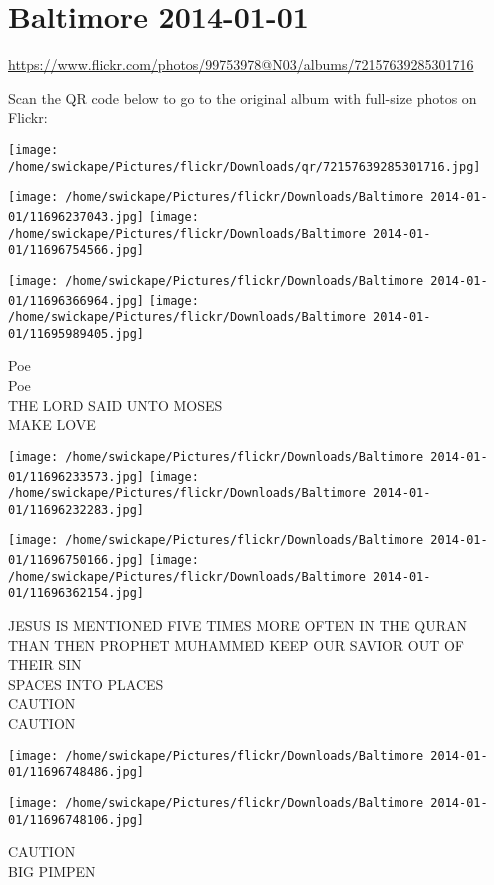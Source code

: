 \documentclass[10pt,letterpaper]{article}
\title{}
\author{}
\date{}
\begin{document}
\section*{Baltimore 2014-01-01}

\url{https://www.flickr.com/photos/99753978@N03/albums/72157639285301716}

Scan the QR code below to go to the original album with full-size photos on Flickr:

\texttt{[image: /home/swickape/Pictures/flickr/Downloads/qr/72157639285301716.jpg]}
\pagebreak

\texttt{[image: /home/swickape/Pictures/flickr/Downloads/Baltimore 2014-01-01/11696237043.jpg]}
\texttt{[image: /home/swickape/Pictures/flickr/Downloads/Baltimore 2014-01-01/11696754566.jpg]}

\texttt{[image: /home/swickape/Pictures/flickr/Downloads/Baltimore 2014-01-01/11696366964.jpg]}
\texttt{[image: /home/swickape/Pictures/flickr/Downloads/Baltimore 2014-01-01/11695989405.jpg]}

Poe\\
Poe\\
THE LORD SAID UNTO MOSES\\
MAKE LOVE
\pagebreak

\texttt{[image: /home/swickape/Pictures/flickr/Downloads/Baltimore 2014-01-01/11696233573.jpg]}
\texttt{[image: /home/swickape/Pictures/flickr/Downloads/Baltimore 2014-01-01/11696232283.jpg]}

\texttt{[image: /home/swickape/Pictures/flickr/Downloads/Baltimore 2014-01-01/11696750166.jpg]}
\texttt{[image: /home/swickape/Pictures/flickr/Downloads/Baltimore 2014-01-01/11696362154.jpg]}

JESUS IS MENTIONED FIVE TIMES MORE OFTEN IN THE QURAN THAN THEN PROPHET MUHAMMED KEEP OUR SAVIOR OUT OF THEIR SIN\\
SPACES INTO PLACES\\
CAUTION\\
CAUTION
\pagebreak

\texttt{[image: /home/swickape/Pictures/flickr/Downloads/Baltimore 2014-01-01/11696748486.jpg]}

\vspace{0.25in}
\texttt{[image: /home/swickape/Pictures/flickr/Downloads/Baltimore 2014-01-01/11696748106.jpg]}

CAUTION\\
BIG PIMPEN
\pagebreak
\end{document}
